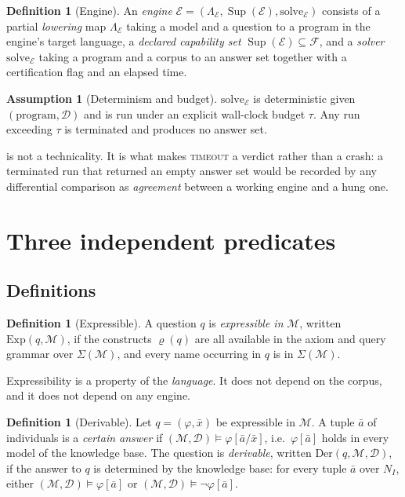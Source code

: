 \documentclass[11pt,a4paper]{article}
\theoremstyle{plain}
\theoremstyle{definition}
\newtheorem{definition}[theorem]{Definition}
\newtheorem{assumption}[theorem]{Assumption}
\theoremstyle{remark}
\newcommand{\Model}{\mathcal{M}}          %
\newcommand{\Corpus}{\mathcal{D}}         %
\newcommand{\Engine}{\mathcal{E}}         %
\newcommand{\Feat}{\mathcal{F}}           %
\newcommand{\req}{\varrho}                %
\renewcommand{\sup}{\operatorname{Sup}}   %
\newcommand{\vtime}{\textsc{timeout}}
\newcommand{\lowr}{\Lambda}               %
\newcommand{\qq}{q}
\begin{document}
\begin{definition}[Engine]
\label{def:engine}
An \emph{engine} $\Engine = (\lowr_\Engine, \sup(\Engine), \mathrm{solve}_\Engine)$
consists of a partial \emph{lowering} map $\lowr_\Engine$ taking a model and a
question to a program in the engine's target language, a \emph{declared
capability set} $\sup(\Engine) \subseteq \Feat$, and a \emph{solver}
$\mathrm{solve}_\Engine$ taking a program and a corpus to an answer set
together with a certification flag and an elapsed time.
\end{definition}

\begin{assumption}[Determinism and budget]
\label{ass:budget}
$\mathrm{solve}_\Engine$ is deterministic given $(\text{program}, \Corpus)$
and is run under an explicit wall-clock budget $\tau$. Any run exceeding $\tau$
is terminated and produces no answer set.
\end{assumption}

 is not a technicality. It is what makes \vtime{} a verdict
rather than a crash: a terminated run that returned an empty answer set would
be recorded by any differential comparison as \emph{agreement} between a
working engine and a hung one.

\section{Three independent predicates}
\label{sec:three}

\subsection{Definitions}

\begin{definition}[Expressible]
\label{def:expressible}
A question $\qq$ is \emph{expressible in} $\Model$, written
$\mathrm{Exp}(\qq, \Model)$, if the constructs $\req(\qq)$ are all available in
the axiom and query grammar over $\Sigma(\Model)$, and every name occurring in
$\qq$ is in $\Sigma(\Model)$.
\end{definition}

Expressibility is a property of the \emph{language}. It does not depend on the
corpus, and it does not depend on any engine.

\begin{definition}[Derivable]
\label{def:derivable}
Let $\qq = (\varphi, \bar{x})$ be expressible in $\Model$. A tuple $\bar{a}$ of
individuals is a \emph{certain answer} if
$(\Model, \Corpus) \models \varphi[\bar{a}/\bar{x}]$, i.e.\ $\varphi[\bar{a}]$
holds in every model of the knowledge base. The question is \emph{derivable},
written $\mathrm{Der}(\qq, \Model, \Corpus)$, if the answer to $\qq$ is
determined by the knowledge base: for every tuple $\bar{a}$ over $N_I$, either
$(\Model, \Corpus) \models \varphi[\bar{a}]$ or
$(\Model, \Corpus) \models \neg\varphi[\bar{a}]$.
\end{definition}
\end{document}
